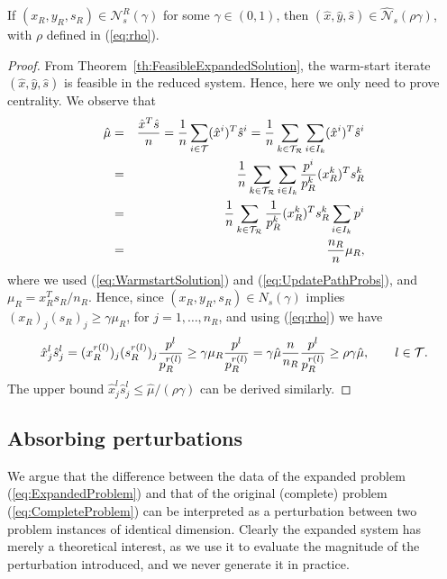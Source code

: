 \begin{theorem}  \label{th:NeighbourhoodExpandedSolution}
If $(x_R, y_R, s_R) \in \mathcal{N}^R_s(\gamma)$ 
for some $\gamma\in(0,1)$, then $(\hat{x}, \hat{y}, \hat{s})\in
\widehat{\mathcal{N}}_s(\rho\gamma)$,
with $\rho$ defined in (\ref{eq:rho}).
\end{theorem}
%
\begin{proof}
From Theorem~\ref{th:FeasibleExpandedSolution}, the warm-start iterate 
$(\hat x, \hat y, \hat s)$ is feasible in the reduced system.
Hence, here we only need to prove centrality. 
We observe that 
\begin{eqnarray*}
  \hat{\mu} &=& \frac{\hat{x}^T\hat{s}}{n} 
   = \frac{1}{n}\sum_{i \in \mathcal{T}}(\hat x^i)^T\hat{s}^i 
   = \frac{1}{n}\sum_{k\in \mathcal{T}_\mathcal{R}}\sum_{i\in I_k} (\hat{x}^i)^T\hat{s}^i \\
  &=& \frac{1}{n}\sum_{k\in \mathcal{T}_\mathcal{R}}\sum_{i\in I_k} \frac{p^i}{p_R^k} 
      (x_R^k)^T s_R^k \\
  &=& \frac{1}{n} \sum_{k\in\mathcal{T}_\mathcal{R}} \frac{1}{p_R^k}(x_R^k)^T s_R^k
      \sum_{i\in I_k}p^i\\
  &=& \frac{n_R}{n} \mu_R,
\end{eqnarray*}
where we used (\ref{eq:WarmstartSolution}) and (\ref{eq:UpdatePathProbs}), 
and $\mu_R = x_R^Ts_R/n_R$. 
Hence, since $(x_R, y_R, s_R)\in N_s(\gamma)$ 
implies $(x_R)_j (s_R)_j\ge \gamma\mu_R$, for $j = 1, \ldots, n_R$, 
and using (\ref{eq:rho}) we have
\[
  \hat x^l_j\hat s^l_j = (x_R^{r(l)})_j (s_R^{r(l)})_j
                         \frac{p^l}{p_R^{r(l)}}
                       \ge \gamma\mu_R \frac{p^l}{p_R^{r(l)}}
		       = \gamma\hat\mu \frac{n}{n_R}\frac{p^l}{p_R^{r(l)}}
                       \ge \rho\gamma\hat{\mu},
		       \qquad l \in \mathcal{T}.
\]
The upper bound $\hat x^l_j\hat s^l_j\le \hat{\mu}/(\rho\gamma)$
can be derived similarly.
\end{proof}

%
%
\subsection{Absorbing perturbations}

We argue that the difference between the data of the expanded 
problem (\ref{eq:ExpandedProblem}) and that of the original (complete) 
problem (\ref{eq:CompleteProblem}) can be interpreted as a perturbation 
between two problem instances of identical dimension. 
Clearly the expanded system has merely a theoretical
interest, as we use it to evaluate the magnitude of the 
perturbation introduced, and we never generate it in practice.


